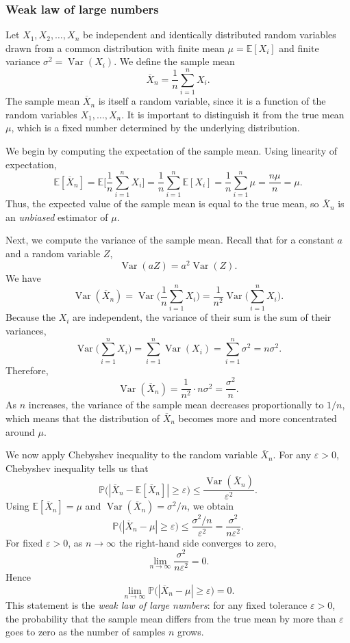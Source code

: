 \subsubsection{Weak law of large numbers}

Let \(X_{1}, X_{2}, \dots, X_{n}\) be independent and identically distributed random variables drawn from a common distribution with finite mean \(\mu = \mathbb{E}[X_i]\) and finite variance \(\sigma^{2} = \operatorname{Var}(X_i)\).  
We define the sample mean
\[
\overline{X}_{n}
=
\frac{1}{n} \sum_{i=1}^{n} X_i.
\]
The sample mean \(\overline{X}_{n}\) is itself a random variable, since it is a function of the random variables \(X_1,\dots,X_n\).  
It is important to distinguish it from the true mean \(\mu\), which is a fixed number determined by the underlying distribution.  

We begin by computing the expectation of the sample mean.  
Using linearity of expectation,
\[
\mathbb{E}[\overline{X}_{n}]
=
\mathbb{E}\Bigg[\frac{1}{n} \sum_{i=1}^{n} X_i\Bigg]
=
\frac{1}{n}\sum_{i=1}^{n} \mathbb{E}[X_i]
=
\frac{1}{n}\sum_{i=1}^{n} \mu
=
\frac{n\mu}{n}
=
\mu.
\]
Thus, the expected value of the sample mean is equal to the true mean, so \(\overline{X}_{n}\) is an \textit{unbiased} estimator of \(\mu\).  

Next, we compute the variance of the sample mean.  
Recall that for a constant \(a\) and a random variable \(Z\),
\[
\operatorname{Var}(a Z)
=
a^{2}\operatorname{Var}(Z).
\]
We have
\[
\operatorname{Var}(\overline{X}_{n})
=
\operatorname{Var}\Bigg(\frac{1}{n} \sum_{i=1}^{n} X_i\Bigg)
=
\frac{1}{n^{2}} \operatorname{Var}\Bigg(\sum_{i=1}^{n} X_i\Bigg).
\]
Because the \(X_i\) are independent, the variance of their sum is the sum of their variances,
\[
\operatorname{Var}\Bigg(\sum_{i=1}^{n} X_i\Bigg)
=
\sum_{i=1}^{n} \operatorname{Var}(X_i)
=
\sum_{i=1}^{n} \sigma^{2}
=
n \sigma^{2}.
\]
Therefore,
\[
\operatorname{Var}(\overline{X}_{n})
=
\frac{1}{n^{2}} \cdot n \sigma^{2}
=
\frac{\sigma^{2}}{n}.
\]
As \(n\) increases, the variance of the sample mean decreases proportionally to \(1/n\), which means that the distribution of \(\overline{X}_{n}\) becomes more and more concentrated around \(\mu\).  

We now apply Chebyshev inequality to the random variable \(\overline{X}_{n}\).  
For any \(\varepsilon > 0\), Chebyshev inequality tells us that
\[
\mathbb{P}\big(|\overline{X}_{n} - \mathbb{E}[\overline{X}_{n}]| \ge \varepsilon\big)
\le
\frac{\operatorname{Var}(\overline{X}_{n})}{\varepsilon^{2}}.
\]
Using \(\mathbb{E}[\overline{X}_{n}] = \mu\) and \(\operatorname{Var}(\overline{X}_{n}) = \sigma^{2}/n\), we obtain
\[
\mathbb{P}\big(|\overline{X}_{n} - \mu| \ge \varepsilon\big)
\le
\frac{\sigma^{2}/n}{\varepsilon^{2}}
=
\frac{\sigma^{2}}{n \varepsilon^{2}}.
\]
For fixed \(\varepsilon > 0\), as \(n \to \infty\) the right-hand side converges to zero,
\[
\lim_{n \to \infty} \frac{\sigma^{2}}{n \varepsilon^{2}} = 0.
\]
Hence
\[
\lim_{n \to \infty} \mathbb{P}\big(|\overline{X}_{n} - \mu| \ge \varepsilon\big) = 0.
\]
This statement is the \textit{weak law of large numbers}: for any fixed tolerance \(\varepsilon > 0\), the probability that the sample mean differs from the true mean by more than \(\varepsilon\) goes to zero as the number of samples \(n\) grows.  

